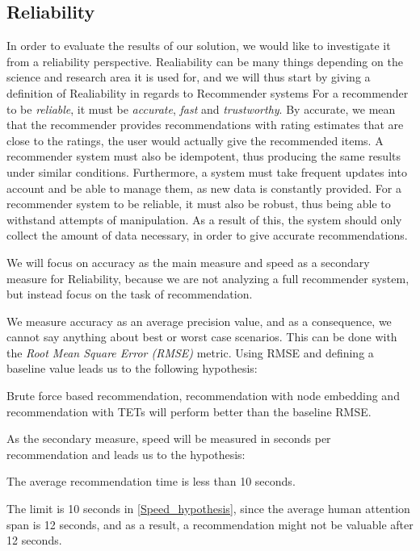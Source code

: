 \subsection{Reliability}\label{Subsec:Reliability_definition}
In order to evaluate the results of our solution, we would like to investigate it from a reliability perspective. Realiability can be many things depending on the science and research area it is used for, and we will thus start by giving a definition of Realiability in regards to Recommender systems
For a recommender to be \textit{reliable}, it must be \textit{accurate}, \textit{fast} and \textit{trustworthy}.
By accurate, we mean that the recommender provides recommendations with rating estimates that are close to the ratings, the user would actually give the recommended items.
A recommender system must also be idempotent, thus producing the same results under similar conditions. Furthermore, a system must take frequent updates into account and be able to manage them, as new data is constantly provided.
For a recommender system to be reliable, it must also be robust, thus being able to withstand attempts of manipulation. As a result of this, the system should only collect the amount of data necessary, in order to give accurate recommendations.

 We will focus on accuracy as the main measure and speed as a secondary measure for Reliability, because we are not analyzing a full recommender system, but instead focus on the task of recommendation.


We measure accuracy as an average precision value, and as a consequence, we cannot say anything about best or worst case scenarios. This can be done with the \textit{Root Mean Square Error (RMSE)} metric. Using RMSE and defining a baseline value leads us to the following hypothesis:
\begin{hypothesis}\label{RMSE_hypothesis}
  Brute force based recommendation, recommendation with node embedding and recommendation with TETs will perform better than the baseline RMSE.
\end{hypothesis}
As the secondary measure, speed will be measured in seconds per recommendation and leads us to the hypothesis:
\begin{hypothesis}\label{Speed_hypothesis}
  The average recommendation time is less than 10 seconds.
\end{hypothesis}


The limit is 10 seconds in \autoref{Speed_hypothesis}, since the average human attention span is 12 seconds, and as a result, a recommendation might not be valuable after 12 seconds.




